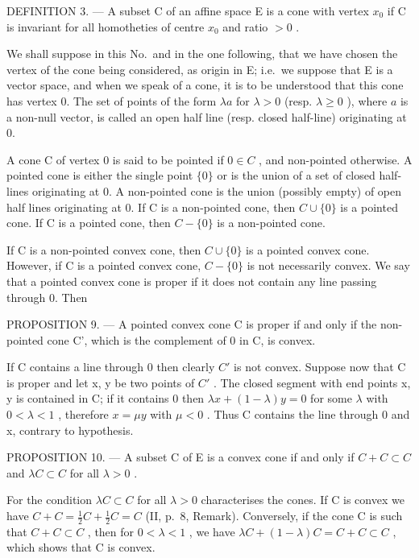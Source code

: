 DEFINITION 3. --- A subset C of an affine space E is a cone with vertex \(x_0\) if C is invariant for all homotheties of centre \(x_0\) and ratio \(> 0\) .

We shall suppose in this No.~and in the one following, that we have chosen the vertex of the cone being considered, as origin in E; i.e.~we suppose that E is a vector space, and when we speak of a cone, it is to be understood that this cone has vertex 0. The set of points of the form \(\lambda a\) for \(\lambda > 0\) (resp. \(\lambda \geqslant 0\) ), where \(a\) is a non-null vector, is called an open half line (resp. closed half-line) originating at 0.

A cone C of vertex 0 is said to be pointed if \(0 \in C\) , and non-pointed otherwise. A pointed cone is either the single point \(\{0\}\) or is the union of a set of closed half-lines originating at 0. A non-pointed cone is the union (possibly empty) of open half lines originating at 0. If C is a non-pointed cone, then \(C \cup \{0\}\) is a pointed cone. If C is a pointed cone, then \(C - \{0\}\) is a non-pointed cone.

If C is a non-pointed convex cone, then \(C \cup \{0\}\) is a pointed convex cone. However, if C is a pointed convex cone, \(C - \{0\}\) is not necessarily convex. We say that a pointed convex cone is proper if it does not contain any line passing through 0. Then

PROPOSITION 9. --- A pointed convex cone C is proper if and only if the non-pointed cone C', which is the complement of 0 in C, is convex.

If C contains a line through 0 then clearly \(C'\) is not convex. Suppose now that C is proper and let x, y be two points of \(C'\) . The closed segment with end points x, y is contained in C; if it contains 0 then \(\lambda x + (1 - \lambda)y = 0\) for some \(\lambda\) with \(0 < \lambda < 1\) , therefore \(x = \mu y\) with \(\mu < 0\) . Thus C contains the line through 0 and x, contrary to hypothesis.

PROPOSITION 10. --- A subset C of E is a convex cone if and only if \(C + C \subset C\) and \(\lambda C \subset C\) for all \(\lambda > 0\) .

For the condition \(\lambda C \subset C\) for all \(\lambda > 0\) characterises the cones. If C is convex we have \(C + C = \frac{1}{2}C + \frac{1}{2}C = C\) (II, p.~8, Remark). Conversely, if the cone C is such that \(C + C \subset C\) , then for \(0 < \lambda < 1\) , we have \(\lambda C + (1 - \lambda)C = C + C \subset C\) , which shows that C is convex.


